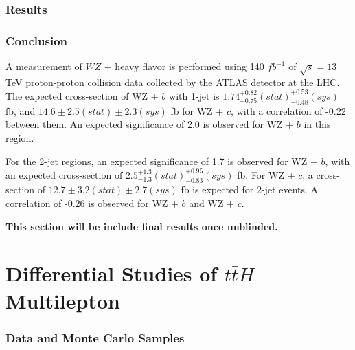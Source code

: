\documentclass[NOTE, atlasdraft=true, texlive=2016, UKenglish]{\ATLASLATEXPATH atlasdoc}
\begin{document}
\section{Results}
\label{sec:results}                                                                                                          


\section{Conclusion}
\label{sec:conclusion}

A measurement of $WZ$ + heavy flavor is performed using 140 $fb^{-1}$ of $\sqrt{s} = 13$ TeV proton-proton collision data collected by the ATLAS detector at the LHC. The expected cross-section of WZ + $b$ with 1-jet is $1.74^{+0.82}_{-0.75}(stat)^{+0.53}_{-0.48}(sys)$ fb, and $14.6 \pm 2.5 (stat) \pm 2.3 (sys)$ fb for WZ + $c$, with a correlation of -0.22 between them. An expected significance of 2.0 is observed for WZ + $b$ in this region.

For the 2-jet regions, an expected significance of 1.7 is observed for WZ + $b$, with an expected cross-section of $2.5^{+1.3}_{-1.3}(stat)^{+0.95}_{-0.83}(sys)$ fb. For WZ + $c$, a cross-section of $12.7 \pm 3.2 (stat) \pm 2.7 (sys)$ fb is expected for 2-jet events. A correlation of -0.26 is observed for WZ + $b$ and WZ + $c$.

\textbf{This section will be include final results once unblinded.}


\part{Differential Studies of $t\bar{t}H$ Multilepton }
\label{part:analysis}


\section{Data and Monte Carlo Samples}
\label{sec:dataMC}

\end{document}
